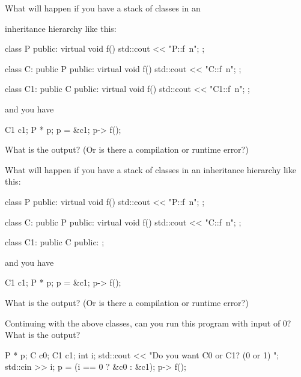 \begin{ex}What will happen if you have a stack of classes in an

inheritance hierarchy like this:

\begin{console}
class P
{
public:
     virtual void f() { std::cout << "P::f\ n"; }
};

class C: public P
{
public:
     virtual void f() { std::cout << "C::f\ n"; }
};

class C1: public C
{
public:
     virtual void f() { std::cout << "C1::f\ n"; }
};
\end{console}

and you have

\begin{console}
C1 c1;
P * p;
p = &c1;
p-> f();
\end{console}

What is the output? (Or is there a compilation or runtime error?)
\end{ex}
\begin{ex}What will happen if you have a stack of classes in an inheritance hierarchy like this:

\begin{console}
class P
{
public:
     virtual void f() { std::cout << "P::f\ n"; }
};

class C: public P
{
public:
     virtual void f() { std::cout << "C::f\ n"; }
};

class C1: public C
{
public:
};
\end{console}

and you have

\begin{console}
C1 c1;
P * p;
p = &c1;
p-> f();
\end{console}

What is the output? (Or is there a compilation or runtime error?)
\end{ex}
\begin{ex}Continuing with the above classes, can you run this
program with input of 0? What is the output?

\begin{console}
P * p;
C c0;
C1 c1;
int i;
std::cout << "Do you want C0 or C1? (0 or 1) ";
std::cin >> i;
p = (i == 0 ? &c0 : &c1);
p-> f();
\end{console}
\end{ex}

\newpage{}

